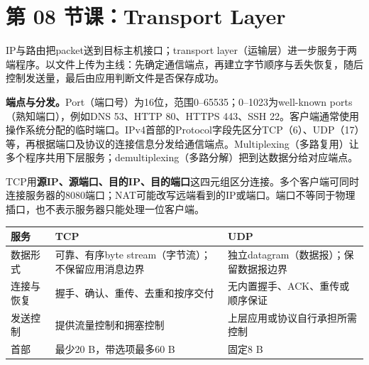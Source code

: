 \begingroup
\renewcommand{\recordid}[1]{}
\renewcommand{\relatedexercise}[2]{\hyperref[exercise:#1]{#2}}

\section{第 08 节课：Transport Layer}
\label{lecture:SC2008-L08}


IP与路由把packet送到目标主机接口；transport layer（运输层）进一步服务于两端程序。以文件上传为主线：先确定通信端点，再建立字节顺序与丢失恢复，随后控制发送量，最后由应用判断文件是否保存成功。


\textbf{端点与分发。}Port（端口号）为16位，范围0--65535；0--1023为well-known ports（熟知端口），例如DNS 53、HTTP 80、HTTPS 443、SSH 22。客户端通常使用操作系统分配的临时端口。IPv4首部的Protocol字段先区分TCP（6）、UDP（17）等，再根据端口及协议的连接信息分发给通信端点。Multiplexing（多路复用）让多个程序共用下层服务；demultiplexing（多路分解）把到达数据分给对应端点。

TCP用\textbf{源IP、源端口、目的IP、目的端口}这四元组区分连接。多个客户端可同时连接服务器的8080端口；NAT可能改写远端看到的IP或端口。端口不等同于物理插口，也不表示服务器只能处理一位客户端。

\begin{center}
\small
\begin{tabularx}{\textwidth}{@{}p{2.1cm}XX@{}}
\toprule
服务 & TCP & UDP \\
\midrule
数据形式 & 可靠、有序byte stream（字节流）；不保留应用消息边界 & 独立datagram（数据报）；保留数据报边界 \\
连接与恢复 & 握手、确认、重传、去重和按序交付 & 无内置握手、ACK、重传或顺序保证 \\
发送控制 & 提供流量控制和拥塞控制 & 上层应用或协议自行承担所需控制 \\
首部 & 最少20 B，带选项最多60 B & 固定8 B \\
\bottomrule
\end{tabularx}
\end{center}

